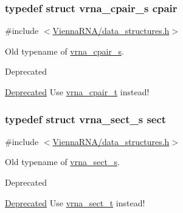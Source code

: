 \subsubsection[{cpair}]{\setlength{\rightskip}{0pt plus 5cm}typedef struct {\bf vrna\+\_\+cpair\+\_\+s} {\bf cpair}}\label{group__data__structures_ga8412f116a2eb07b59ade9e14ca7c5ef1}


{\ttfamily \#include $<$\hyperlink{data__structures_8h}{Vienna\+R\+N\+A/data\+\_\+structures.\+h}$>$}



Old typename of \hyperlink{group__data__structures_structvrna__cpair__s}{vrna\+\_\+cpair\+\_\+s}. 

\begin{DoxyRefDesc}{Deprecated}
\item[\hyperlink{deprecated__deprecated000048}{Deprecated}]Use \hyperlink{group__data__structures_gae4fc91141cc69c6d8eaf1332cb991ecc}{vrna\+\_\+cpair\+\_\+t} instead! \end{DoxyRefDesc}
\hypertarget{group__data__structures_gaaacedee1f05d3d45aa6764eca51a8876}{}
\subsubsection[{sect}]{\setlength{\rightskip}{0pt plus 5cm}typedef struct {\bf vrna\+\_\+sect\+\_\+s} {\bf sect}}\label{group__data__structures_gaaacedee1f05d3d45aa6764eca51a8876}


{\ttfamily \#include $<$\hyperlink{data__structures_8h}{Vienna\+R\+N\+A/data\+\_\+structures.\+h}$>$}



Old typename of \hyperlink{group__data__structures_structvrna__sect__s}{vrna\+\_\+sect\+\_\+s}. 

\begin{DoxyRefDesc}{Deprecated}
\item[\hyperlink{deprecated__deprecated000049}{Deprecated}]Use \hyperlink{group__data__structures_gacc9cdae790dac75a7024e7069c0d4400}{vrna\+\_\+sect\+\_\+t} instead! \end{DoxyRefDesc}
\hypertarget{group__data__structures_gaaeed53a7508c6ce549a98223e94b25df}{}
